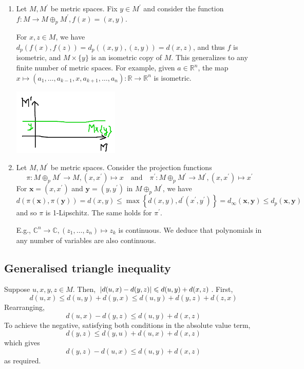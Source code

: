 \documentclass[a4paper]{article}
\begin{document}
\begin{example}
\begin{enumerate}
        \item Let $M, M^{\prime}$ be metric spaces.
        Fix $y \in M^{\prime}$ and consider the function $f: M \rightarrow M \oplus_p M^{\prime}, f(x)=(x, y)$. 
        
        For $x, z \in M$, we have $d_p(f(x), f(z))=d_p((x, y),(z, y))=d(x, z)$, and thus $f$ is isometric, and $M \times\{y\}$ is an isometric copy of $M$.
        This generalizes to any finite number of metric spaces. For example, given $a \in \mathbb{R}^n$, the map $x \mapsto\left(a_1, \ldots, a_{k-1}, x, a_{k+1}, \ldots, a_n\right): \mathbb{R} \rightarrow \mathbb{R}^n$ is isometric.

        \begin{center}
            \includegraphics[width=0.4\textwidth]{at2.png}
        \end{center}
        
        \item Let $M, M^{\prime}$ be metric spaces. Consider the projection functions
        \[
            \pi: M \oplus_p M^{\prime} \rightarrow M,\left(x, x^{\prime}\right) \mapsto x \quad \text{and}\quad \pi^{\prime}: M \oplus_p M^{\prime} \rightarrow M^{\prime},\left(x, x^{\prime}\right) \mapsto x^{\prime}
        \]
        For $\mathbf{x}=\left(x, x^{\prime}\right)$ and $\mathbf{y}=\left(y, y^{\prime}\right)$ in $M \oplus_p M^{\prime}$, we have
        \[
        d(\pi(\mathbf{x}), \pi(\mathbf{y}))=d(x, y) \leqslant \max \left\{d(x, y), d^{\prime}\left(x^{\prime}, y^{\prime}\right)\right\}=d_{\infty}(\mathbf{x}, \mathbf{y}) \leqslant d_p(\mathbf{x}, \mathbf{y})
        \]
        and so $\pi$ is 1-Lipschitz. The same holds for $\pi^{\prime}$.

        E.g., $\mathbb{C}^n \rightarrow \mathbb{C},\left(z_1, \ldots, z_n\right) \mapsto z_k$ is continuous. We deduce that polynomials in any number of variables are also continuous.
    \end{enumerate}
\end{example}

\subsection{Generalised triangle inequality}
Suppose \( u,x,y,z \in M \).
Then, \( \abs{d(u,x) - d(y,z)} \leqslant d(u,y) + d(x,z) \).
First,
\[
	d(u,x) \leq d(u,y) + d(y,x) \leq d(u,y) + d(y,z) + d(z,x)
\]
Rearranging,
\[
	d(u,x)-d(y,z) \leq d(u,y) + d(x,z)
\]
To achieve the negative, satisfying both conditions in the absolute value term,
\[
	d(y,z) \leq d(y,u) + d(u,x) + d(x,z)
\]
which gives
\[
	d(y,z) - d(u,x) \leq d(u,y) + d(x,z)
\]
as required.
\end{document}
